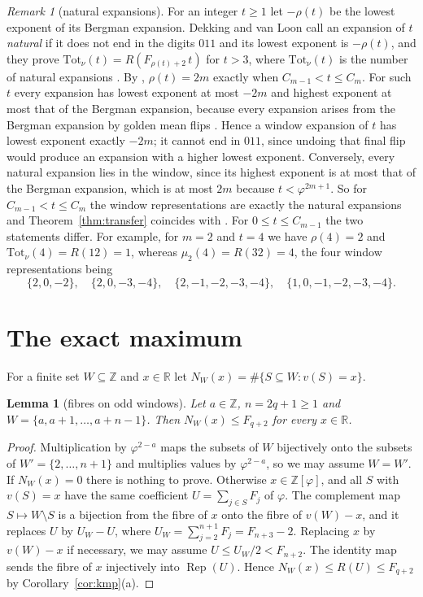 \documentclass[11pt]{amsart}
\newtheorem{lemma}[theorem]{Lemma}
\theoremstyle{definition}
\theoremstyle{remark}
\newtheorem{remark}[theorem]{Remark}
\numberwithin{equation}{section}
\newcommand{\Z}{\mathbb{Z}}
\newcommand{\R}{\mathbb{R}}
\newcommand{\val}{v}
\newcommand{\Rep}{\operatorname{Rep}}
\begin{document}
\begin{remark}[natural expansions]\label{rem:natural}
For an integer $t\ge1$ let $-\rho(t)$ be the lowest exponent of its Bergman expansion. Dekking and
van Loon call an expansion of $t$ \emph{natural} if it does not end in the digits $011$ and its
lowest exponent is $-\rho(t)$, and they prove $\mathrm{Tot}_\nu(t)=R(F_{\rho(t)+2}\,t)$ for $t>3$,
where $\mathrm{Tot}_\nu(t)$ is the number of natural expansions
\cite[Theorem~4.4]{DekkingVanLoon2024}. By \cite[Proposition~5.1(b)]{DekkingVanLoon2024},
$\rho(t)=2m$ exactly when $C_{m-1}<t\le C_m$. For such $t$ every expansion has lowest exponent at most
$-2m$ and highest exponent at most that of the Bergman expansion, because every expansion arises from
the Bergman expansion by golden mean flips \cite[Theorem~2.1]{DekkingVanLoon2024}. Hence a window
expansion of $t$ has lowest exponent exactly $-2m$; it cannot end in $011$, since undoing that final
flip would produce an expansion with a higher lowest exponent. Conversely, every natural expansion
lies in the window, since its highest exponent is at most that of the Bergman expansion, which is at
most $2m$ because $t<\varphi^{2m+1}$. So for $C_{m-1}<t\le C_m$ the window representations are exactly the natural
expansions and Theorem~\ref{thm:transfer} coincides with \cite[Theorem~4.4]{DekkingVanLoon2024}. For
$0\le t\le C_{m-1}$ the two statements differ. For example, for $m=2$ and $t=4$ we have
$\rho(4)=2$ and $\mathrm{Tot}_\nu(4)=R(12)=1$, whereas $\mu_2(4)=R(32)=4$, the four window
representations being
\[
  \{2,0,-2\},\quad \{2,0,-3,-4\},\quad \{2,-1,-2,-3,-4\},\quad \{1,0,-1,-2,-3,-4\}.
\]
\end{remark}

\section{The exact maximum}\label{sec:max}

For a finite set $W\subseteq\Z$ and $x\in\R$ let $N_W(x)=\#\{S\subseteq W:\val(S)=x\}$.

\begin{lemma}[fibres on odd windows]\label{lem:fibre}
Let $a\in\Z$, $n=2q+1\ge1$ and $W=\{a,a+1,\dots,a+n-1\}$. Then $N_W(x)\le F_{q+2}$ for every
$x\in\R$.
\end{lemma}

\begin{proof}
Multiplication by $\varphi^{2-a}$ maps the subsets of $W$ bijectively onto the subsets of
$W'=\{2,\dots,n+1\}$ and multiplies values by $\varphi^{2-a}$, so we may assume $W=W'$. If $N_W(x)=0$
there is nothing to prove. Otherwise $x\in\Z[\varphi]$, and all $S$ with $\val(S)=x$ have the same
coefficient $U=\sum_{j\in S}F_j$ of $\varphi$. The complement map $S\mapsto W\setminus S$ is a
bijection from the fibre of $x$ onto the fibre of $\val(W)-x$, and it replaces $U$ by $U_W-U$, where
$U_W=\sum_{j=2}^{n+1}F_j=F_{n+3}-2$. Replacing $x$ by $\val(W)-x$ if necessary, we may assume
$U\le U_W/2<F_{n+2}$. The identity map sends the fibre of $x$ injectively into $\Rep(U)$. Hence
$N_W(x)\le R(U)\le F_{q+2}$ by Corollary~\ref{cor:kmp}(a).
\end{proof}
\end{document}

